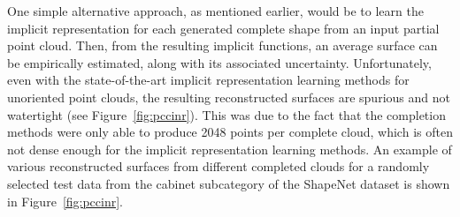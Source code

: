     One simple alternative approach, as mentioned earlier, would be to learn the implicit representation for each generated complete shape from an input partial point cloud. Then, from the resulting implicit functions, an average surface can be empirically estimated, along with its associated uncertainty. Unfortunately, even with the state-of-the-art implicit representation learning methods for unoriented point clouds, the resulting reconstructed surfaces are spurious and not watertight (see Figure~\ref{fig:pccinr}). This was due to the fact that the completion methods were only able to produce 2048 points per complete cloud, which is often not dense enough for the implicit representation learning methods. An example of various reconstructed surfaces from different completed clouds for a randomly selected test data from the cabinet subcategory of the ShapeNet dataset is shown in Figure~\ref{fig:pccinr}. 

